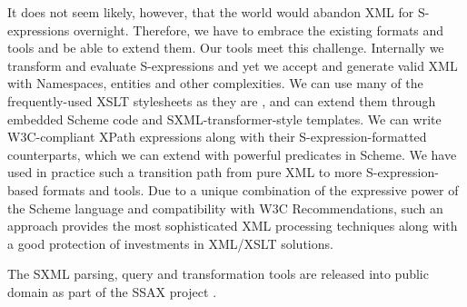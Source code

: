 \documentclass[10pt]{llncs}
\begin{document}
It does not seem likely, however, that the world would abandon
XML for S-expressions overnight. Therefore, we have to embrace the
existing formats and tools and be able to extend them. Our tools meet
this challenge. Internally we transform and evaluate S-expressions
and yet we accept and generate valid XML with Namespaces, entities and
other complexities. We can use many of the frequently-used XSLT
stylesheets as they are \cite{STX}, and can extend them through
embedded Scheme code and SXML-transformer-style templates. We can
write W3C-compliant XPath expressions along with their
S-expression-formatted counterparts, which we can extend with powerful
predicates in Scheme. We have used in practice such a transition path
from pure XML to more S-expression-based formats and tools. Due to a
unique combination of the expressive power of the Scheme language and
compatibility with W3C Recommendations, such an approach provides the
most sophisticated XML processing techniques along with a good
protection of investments in XML/XSLT solutions.

The SXML parsing, query and transformation tools are released into public
domain as part of the SSAX project \cite{SSAX}.
\end{document}
